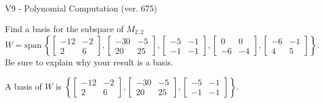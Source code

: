 \begin{exercise}
  \begin{exerciseTitle}V9 - Polynomial Computation (ver. 675)\end{exerciseTitle}
  \begin{exerciseStatement}
    Find a basis for the subspace of \(M_{2,2}\) 
\[W=\mathrm{span}\ \left\{\left[\begin{array}{cc}
-12 & -2 \\
2 & 6
\end{array}\right] , \left[\begin{array}{cc}
-30 & -5 \\
20 & 25
\end{array}\right] , \left[\begin{array}{cc}
-5 & -1 \\
-1 & -1
\end{array}\right] , \left[\begin{array}{cc}
0 & 0 \\
-6 & -4
\end{array}\right] , \left[\begin{array}{cc}
-6 & -1 \\
4 & 5
\end{array}\right]\right\}.\]
 Be sure to explain why your result is a basis.


  \end{exerciseStatement}
  \begin{exerciseAnswer}
   A basis of \(W\) is  \(\left\{\left[\begin{array}{cc}
-12 & -2 \\
2 & 6
\end{array}\right] , \left[\begin{array}{cc}
-30 & -5 \\
20 & 25
\end{array}\right] , \left[\begin{array}{cc}
-5 & -1 \\
-1 & -1
\end{array}\right]\right\}\).
  


  \end{exerciseAnswer}
\end{exercise}